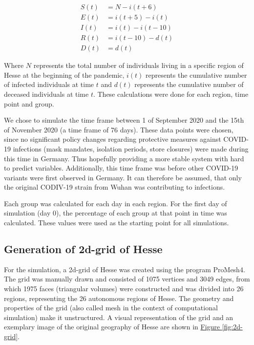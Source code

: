 \begin{align}
	S(t) &= N - i(t+6)\\
	E(t) &= i(t+5) - i(t)\\
	I(t) &= i(t) - i(t-10)\\
	R(t) &= i(t-10) - d(t)\\
	D(t) &= d(t)
\end{align}

\par
Where $N$ represents the total number of individuals living in a specific region of Hesse at the beginning of the pandemic, $i(t)$
represents the cumulative number of infected individuals at time $t$ and $d(t)$ represents the cumulative number of deceased
individuals at time $t$. These calculations were done for each region, time point and group.\newline

We chose to simulate the time frame between 1 of September 2020 and the 15{th} of November 2020 (a time frame of 76 days). These
data points were chosen, since no significant policy changes regarding protective measures against COVID-19 infections
(mask mandates, isolation periods, store closures)  were made during this time in Germany. Thus hopefully providing a more stable system
with hard to predict variables. Additionally, this time frame was before other COVID-19 variants were first observed in
Germany\cite{??}. It can therefore be assumed, that only the original CODIV-19 strain from Wuhan was contributing to infections.\newline

Each group was calculated for each day in each region. For the first day of simulation (day 0), the percentage of each group at that
point in time was calculated. These values were used as the starting point for all simulations.


\subsection{Generation of 2d-grid of Hesse}
For the simulation, a 2d-grid of Hesse was created using the program ProMesh4. The grid was manually drawn and consisted
of 1075 vertices and 3049 edges, from which 1975 faces (triangular volumes) were constructed and was divided into 26 regions,
representing the 26 autonomous regions of Hesse. The geometry and properties of the grid (also called mesh in the context of computational simulation)
make it unstructured. A visual representation of the grid and an exemplary
image of the original geography of Hesse are shown in \hyperref[fig:2d-grid]{Figure \ref*{fig:2d-grid}}.

